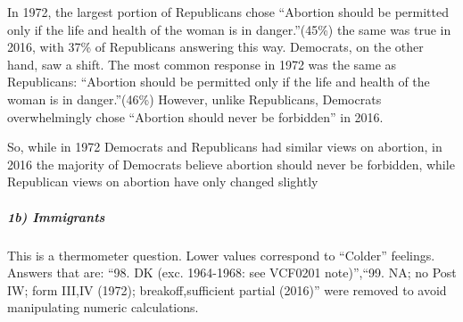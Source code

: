 \documentclass[
]{article}
\begin{document}
In 1972, the largest portion of Republicans chose ``Abortion should be
permitted only if the life and health of the woman is in danger.''(45\%)
the same was true in 2016, with 37\% of Republicans answering this way.
Democrats, on the other hand, saw a shift. The most common response in
1972 was the same as Republicans: ``Abortion should be permitted only if
the life and health of the woman is in danger.''(46\%) However, unlike
Republicans, Democrats overwhelmingly chose ``Abortion should never be
forbidden'' in 2016.

So, while in 1972 Democrats and Republicans had similar views on
abortion, in 2016 the majority of Democrats believe abortion should
never be forbidden, while Republican views on abortion have only changed
slightly

\hypertarget{b-immigrants}{%
\subparagraph{1b) Immigrants}\label{b-immigrants}}

This is a thermometer question. Lower values correspond to ``Colder''
feelings. Answers that are: ``98. DK (exc. 1964-1968: see VCF0201
note)'',``99. NA; no Post IW; form III,IV (1972); breakoff,sufficient
partial (2016)'' were removed to avoid manipulating numeric
calculations.
\end{document}
